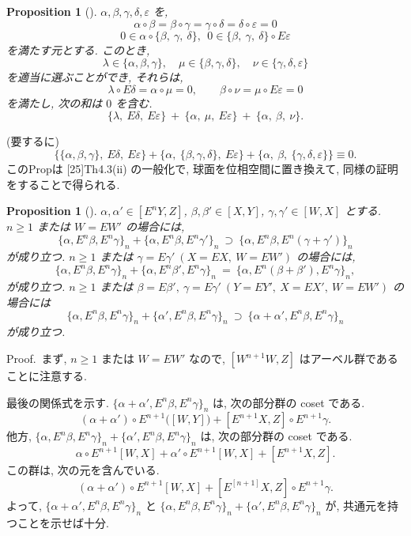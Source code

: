 \documentclass[12pt, leqno]{ltjsarticle}
\newcommand{\Ex}{E}        %
\numberwithin{equation}{section}
\theoremstyle{plain}
\newtheorem{proposition}[theorem]{Proposition}
\theoremstyle{definition}
\theoremstyle{remark}
\begin{document}

\begin{proposition}[]\label{prop:1-5}
$\alpha,\beta,\gamma,\delta,\varepsilon$ を,
\[
\alpha\circ \beta=\beta\circ\gamma=\gamma\circ\delta=\delta\circ\varepsilon=0
\]
\[
0\in \alpha\circ\{\beta,\ \gamma,\ \delta\}, \ \ 0\in\{\beta,\ \gamma,\ \delta\}\circ\Ex\varepsilon
\]
を満たす元とする. このとき,
\[
\lambda\in\{\alpha,\beta,\gamma\},\quad
\mu\in\{\beta,\gamma,\delta\},\quad
\nu\in\{\gamma,\delta,\varepsilon\}
\]
を適当に選ぶことができ, それらは,
\[
\lambda\circ \Ex\delta=\alpha\circ \mu=0,\qquad
\beta\circ \nu=\mu\circ \Ex\varepsilon=0
\]
を満たし, 次の和は $0$ を含む. 
\[
\{\lambda,\ \Ex\delta,\ \Ex\varepsilon\}
\ +\
\{\alpha,\ \mu,\ \Ex\varepsilon\}
\ +\
\{\alpha,\ \beta,\ \nu\}.
\]
\end{proposition}

\noindent (要するに) 
\[
\{\{\alpha,\beta,\gamma\},\ E\delta,\ E\varepsilon\}
+\{\alpha,\ \{\beta,\gamma,\delta\},\ E\varepsilon\}
+\{\alpha,\ \beta,\ \{\gamma,\delta,\varepsilon\}\}
\equiv0 .
\]
このPropは [25]Th4.3(ii) の一般化で, 球面を位相空間に置き換えて, 
同様の証明をすることで得られる. 

\begin{proposition}[]\label{prop:1-6}
$\alpha,\alpha'\in[\Ex^n Y, Z]$, $\beta,\beta'\in[X, Y]$, 
$\gamma,\gamma'\in[W, X]$ とする. \\
$n\ge 1$ \emph{または} $W=\Ex W'$ の場合には,
\[
\{\alpha,\Ex^n\beta,\Ex^n\gamma\}_n
+
\{\alpha,\Ex^n\beta,\Ex^n\gamma'\}_n
\ \supset\
\{\alpha,\Ex^n\beta,\Ex^n(\gamma+\gamma')\}_n
\]
が成り立つ. 
$n\ge 1$ \emph{または} $\gamma=\Ex\gamma' \ (X=\Ex X,\ W=\Ex W')$ の場合には,
\[
\{\alpha,\Ex^n\beta,\Ex^n\gamma\}_n
+
\{\alpha,\Ex^n\beta',\Ex^n\gamma\}_n
\ =\
\{\alpha,\Ex^n(\beta+\beta'),\Ex^n\gamma\}_n,
\]
が成り立つ. $n\ge 1$ \emph{または} $\beta=\Ex\beta',\ \gamma=\Ex\gamma' \ (Y=\Ex Y',\ X=\Ex X',\ W=\Ex W')$ の場合には
\[
\{\alpha,\Ex^n\beta,\Ex^n\gamma\}_n
+
\{\alpha',\Ex^n\beta,\Ex^n\gamma\}_n
\ \supset\
\{\alpha+\alpha',\Ex^n\beta,\Ex^n\gamma\}_n
\]
が成り立つ. 
\end{proposition}

Proof.\
まず, 
\(n\ge1\) または \(W=EW'\) なので, 
\([W^{n+1}W,Z]\) はアーベル群であることに注意する.

最後の関係式を示す. 
\(
\{\alpha+\alpha',\Ex^n\beta,\Ex^n\gamma\}_n
\)
は, 次の部分群の coset である. 
\[
(\alpha+\alpha')\circ \Ex^{n+1}\!\bigl([W, Y]\bigr) 
+ [\Ex^{n+1}X, Z]\circ \Ex^{n+1}\gamma.
\]
他方, 
\(
\{\alpha,\Ex^n\beta,\Ex^n\gamma\}_n + \{\alpha',\Ex^n\beta,\Ex^n\gamma\}_n
\)
は, 次の部分群の coset である.
\[
\alpha\circ E^{n+1}[W,X]
+ \alpha'\circ E^{n+1}[W,X]
+ [E^{n+1}X,Z].
\]
この群は, 次の元を含んでいる.
\[
(\alpha + \alpha') \circ E^{n+1}[W,X]
+ [E^[n+1]X,Z] \circ E^{n+1}\gamma.
\]
よって,
\(
\{\alpha+\alpha',\Ex^n\beta,\Ex^n\gamma\}_n
\)
と
\(
\{\alpha,\Ex^n\beta,\Ex^n\gamma\}_n + \{\alpha',\Ex^n\beta,\Ex^n\gamma\}_n
\)
が, 共通元を持つことを示せば十分.
\end{document}

